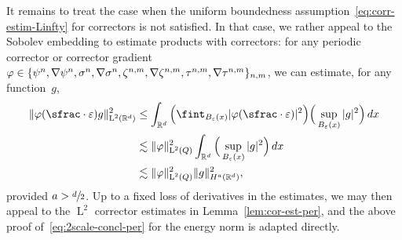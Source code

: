 \documentclass[10pt]{amsart}
\theoremstyle{plain}
\theoremstyle{definition}
\numberwithin{equation}{section}
\newcommand{\e}{\varepsilon}
\newcommand{\R}{\mathbb R}
\newcommand{\Ld}{\operatorname{L}}
\begin{document}
It remains to treat the case when the uniform boundedness assumption~\eqref{eq:corr-estim-Linfty} for correctors is not satisfied.
In that case, we rather appeal to the Sobolev embedding to estimate products with correctors: for any periodic corrector {or corrector gradient $\varphi\in\nobreak\{\psi^n,\nabla\psi^n,\sigma^n,\nabla\sigma^n,\zeta^{n,m},\nabla\zeta^{n,m},\tau^{n,m},\nabla\tau^{n,m}\}_{n,m}$}, we can estimate, for any function~$g$,
\begin{align}
\|\varphi(\sfrac\cdot\e) g\|_{\Ld^2(\R^d)}^2
&\le \int_{\R^d} \Big(\fint_{B_\e(x)} |\varphi(\sfrac\cdot\e)|^2\Big)\Big(\sup_{B_\e(x)} |g|^2\Big)\,dx\nonumber\\
&\lesssim\|\varphi\|_{\Ld^2(Q)}^2\int_{\R^d}\Big(\sup_{B_\e(x)} |g|^2\Big)\,dx\nonumber\\
&\lesssim\|\varphi\|_{\Ld^2(Q)}^2\|g\|_{H^a(\R^d)}^2,\label{eq:use-Sobolev-cor}
\end{align}
provided $a>\sfrac d2$.
Up to a fixed loss of derivatives in the estimates, we may then appeal to the $\Ld^2$ corrector estimates in Lemma~\ref{lem:cor-est-per}, and the above proof of~\eqref{eq:2scale-concl-per} for the energy norm is adapted directly.
\end{document}
